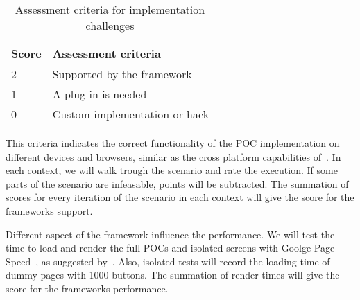 \documentclass[a4paper]{artikel3}
\renewcommand{\paragraph}[1]{\vspace{2mm} \noindent {\bf #1}  }
\begin{document}
\begin{table}[h]
\centering
\begin{tabular}{l|l}
\textbf{Score} & \textbf{Assessment criteria}\\
  \hline \hline
2 & Supported by the framework\\
1 & A plug in is needed\\
0 & Custom implementation or hack\\
\end{tabular}
\caption{Assessment criteria for implementation challenges}
\label{table:challenges-scores}
\end{table}

\paragraph{Support}%
This criteria indicates the correct functionality of the POC implementation on different devices and browsers,  similar as the cross platform capabilities of~\cite{Sarrafi2012a}.  In each context,  we will walk trough the scenario and rate the execution.  If some parts of the scenario are infeasable,  points will be subtracted.  The summation of scores for every iteration of the scenario in each context will give the score for the frameworks support.

\paragraph{Performance}%
Different aspect of the framework influence the performance.  We will test the time to load and render the full POCs and isolated screens with Goolge Page Speed~\cite{Google2012},  as suggested by~\cite{Morgan2011}.   Also,  isolated tests will record the loading time of dummy pages with 1000 buttons.  The summation of render times will give the score for the frameworks performance.

\end{document}
